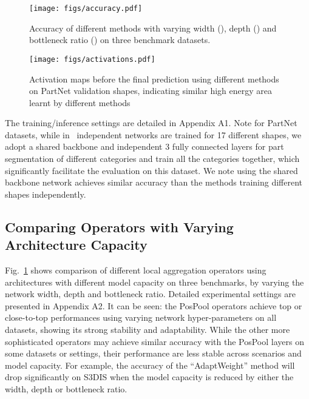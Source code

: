 \documentclass[runningheads]{llncs}
\begin{document}
\begin{figure}[t]
\begin{center}
   \texttt{[image: figs/accuracy.pdf]}
\end{center}
   \vspace{-1em}
   \caption{Accuracy of different methods with varying width (), depth () and bottleneck ratio () on three benchmark datasets.}
   \vspace{-1em}
\label{fig:vary_width_depth}
\end{figure}

\begin{figure}[t]
\begin{center}
   \texttt{[image: figs/activations.pdf]}
\end{center}
   \vspace{-2em}
   \caption{Activation maps before the final prediction using different methods on PartNet validation shapes, indicating similar high energy area learnt by different methods}
   \vspace{-1em}
\label{fig:activation}
\end{figure}

The training/inference settings are detailed in Appendix A1. Note for PartNet datasets, while in~\cite{mo2019partnet} independent networks are trained for 17 different shapes, we adopt a shared backbone and independent 3 fully connected layers for part segmentation of different categories and train all the categories together, which significantly facilitate the evaluation on this dataset.  We note using the shared backbone network achieves similar accuracy than the methods training different shapes independently.

\subsection{Comparing Operators with Varying Architecture Capacity}

Fig.~\ref{fig:vary_width_depth} shows comparison of different local aggregation operators using architectures with different model capacity on three benchmarks, by varying the network width, depth and bottleneck ratio. Detailed experimental settings are presented in Appendix A2. It can be seen: the PosPool operators achieve top or close-to-top performances using varying network hyper-parameters on all datasets, showing its strong stability and adaptability. While the other more sophisticated operators may achieve similar accuracy with the PosPool layers on some datasets or settings, their performance are less stable across scenarios and model capacity. For example, the accuracy of the ``AdaptWeight'' method will drop significantly on S3DIS when the model capacity is reduced by either the width, depth or bottleneck ratio.
\vspace{-1em}
\end{document}
